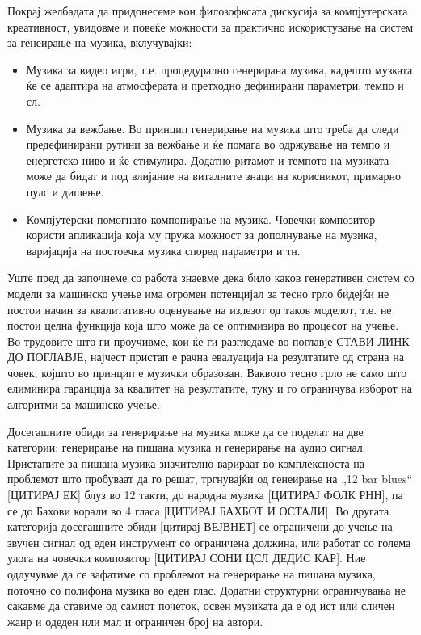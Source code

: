 Покрај желбадата да придонесеме кон филозофксата дискусија за компјутерската креативност, увидовме и повеќе можности за практично искористување на систем за генеирање на музика, вклучувајки:
\begin{itemize}
\item Музика за видео игри, т.е. процедурално генерирана музика, кадешто музката ќе се адаптира на атмосферата и претходно дефинирани параметри, темпо и сл.
\item Музика за вежбање. Во принцип генерирање на музика што треба да следи предефинирани рутини за вежбање и ќе помага во одржување на темпо и енергетско ниво и ќе стимулира. Додатно ритамот и темпото на музиката може да бидат и под влијание на виталните знаци на корисникот, примарно пулс и дишење.
\item Компјутерски помогнато компонирање на музика. Човечки композитор користи апликација која му пружа можност за дополнување на музика, варијација на постоечка музика според параметри и тн.
\end{itemize}

Уште пред да започнеме со работа знаевме дека било каков генеративен систем со модели за машинско учење има огромен потенцијал за тесно грло бидејќи не постои начин за квалитативно оценување на излезот од таков моделот, т.е. не постои целна функција која што може да се оптимизира во процесот на учење. Во трудовите што ги проучивме, кои ќе ги разгледаме во поглавје {СТАВИ ЛИНК ДО ПОГЛАВЈЕ}, најчест пристап е рачна евалуација на резултатите од страна на човек, којшто во принцип е музички образован. Ваквото тесно грло не само што елиминира гаранција за квалитет на резултатите, туку и го ограничува изборот на алгоритми за машинско учење. 

Досегашните обиди за генерирање на музика може да се поделат на две категории: генерирање на пишана музика и генерирање на аудио сигнал. Пристапите за пишана музика значително варираат во комплексноста на проблемот што пробуваат да го решат, тргнувајќи од генеирање на „12 bar blues“ [ЦИТИРАЈ ЕК] блуз во 12 такти, до народна музика [ЦИТИРАЈ ФОЛК РНН], па се до Бахови корали во 4 гласа [ЦИТИРАЈ БАХБОТ И ОСТАЛИ]. Во другата категорија досегашните обиди [цитирај ВЕЈВНЕТ] се ограничени до учење на звучен сигнал од еден инструмент со ограничена должина, или работат со голема улога на човечки композитор [ЦИТИРАЈ СОНИ ЦСЛ ДЕДИС КАР]. Ние одлучувме да се зафатиме со проблемот на генерирање на пишана музика, поточно со полифона музика во еден глас. Додатни структурни ограничувања не сакавме да ставиме од самиот почеток, освен музиката да е од ист или сличен жанр и одеден или мал и ограничен број на автори.

